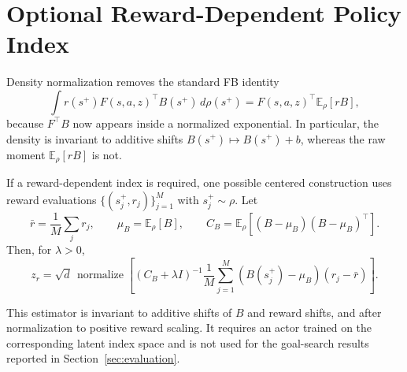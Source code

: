 \documentclass[11pt]{article}
\newcommand{\normalize}{\operatorname{normalize}}
\begin{document}
\section{Optional Reward-Dependent Policy Index}
\label{app:reward-index}

Density normalization removes the standard FB identity
\[
    \int
    r(s^+)
    F(s,a,z)^\top B(s^+)
    \,d\rho(s^+)
    =
    F(s,a,z)^\top
    \mathbb E_\rho[rB],
\]
because $F^\top B$ now appears inside a normalized exponential. In particular, the density is invariant to additive shifts $B(s^+)\mapsto B(s^+)+b$, whereas the raw moment $\mathbb E_\rho[rB]$ is not.

If a reward-dependent index is required, one possible centered construction uses reward evaluations $\{(s_j^+,r_j)\}_{j=1}^{M}$ with $s_j^+\sim\rho$. Let
\[
    \bar r
    =
    \frac1M\sum_j r_j,
    \qquad
    \mu_B
    =
    \mathbb E_\rho[B],
    \qquad
    C_B
    =
    \mathbb E_\rho
    \left[
        (B-\mu_B)(B-\mu_B)^\top
    \right].
\]
Then, for $\lambda>0$,
\begin{equation}
    z_r
    =
    \sqrt d\,
    \normalize
    \left[
        (C_B+\lambda I)^{-1}
        \frac1M
        \sum_{j=1}^{M}
        (B(s_j^+)-\mu_B)(r_j-\bar r)
    \right].
    \label{eq:centered-dual}
\end{equation}

This estimator is invariant to additive shifts of $B$ and reward shifts, and after normalization to positive reward scaling. It requires an actor trained on the corresponding latent index space and is not used for the goal-search results reported in Section~\ref{sec:evaluation}.
\end{document}
